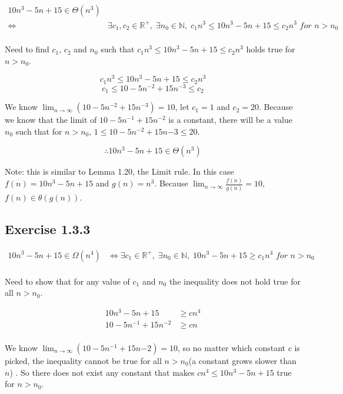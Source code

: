 \documentclass{article}
\newcommand\R{\mathbb{R}}
\begin{document}
\begin{align*}
10n^3-5n+15 \in \Theta(n^3) & \\
\iff &\exists c_1, c_2 \in \R^+,\;\exists n_0 \in \mathbb{N},\; c_1n^3 \leq 10n^3-5n+15 \leq c_2n^3 \textit{ for }  n > n_0  \\
\end{align*}

Need to find  \(c_1\), \(c_2\) and \(n_0\) such that \(c_1n^3 \leq 10n^3-5n+15 \leq c_2n^3\) holds true for \(n > n_0\).

\[c_1n^3 \leq 10n^3-5n+15 \leq c_2n^3\]
\[c_1 \leq 10-5n^{-2}+15n^{-3} \leq c_2\]

We know \(\lim_{n \rightarrow \infty}(10-5n^{-2}+15n^{-3})=10\), let \(c_1=1\) and \( c_2=20\). Because we know that the limit of \(10-5n^{-1}+15n^{-2}\) is a constant, there will be a value  \(n_0\) such that for \(n>n_0\), \( 1\leq 10-5n^{-2}+15n{-3} \leq 20\). 

\[\therefore 10n^3-5n+15 \in \Theta(n^3)\]

Note: this is similar to Lemma 1.20, the Limit rule. In this case \(f(n) = 10n^3-5n+15\) and \(g(n)=n^3\). Because \(\lim_{n \rightarrow \infty}\frac{f(n)}{g(n)}=10\), \(f(n) \in \theta(g(n))\).



\subsection*{Exercise 1.3.3}

\begin{align*}
10n^3-5n+15 \in \Omega(n^4) & \iff \exists c_1 \in \R^+,\;\exists n_0 \in \mathbb{N},\;10n^3-5n+15 \geq c_1n^4\textit{ for }  n > n_0 \\
\end{align*}

Need to show that for any value of \(c_1\) and \(n_0\) the inequality does not hold true for all \(n > n_0\).

\begin{align*}
10n^3-5n+15 &\geq cn^4 \\
10-5n^{-1}+15n^{-2} &\geq cn \\
\end{align*}

We know \(\lim_{n \rightarrow \infty}(10-5n^{-1}+15n{-2})=10\), so no matter which constant \(c\) is picked, the inequality cannot be true for all \(n > n_0\)(a constant grows slower than \(n\)) . So there does not exist any constant that makes \(c n^4 \leq 10n^3-5n+15 \) true for \(n > n_0\).
\end{document}
